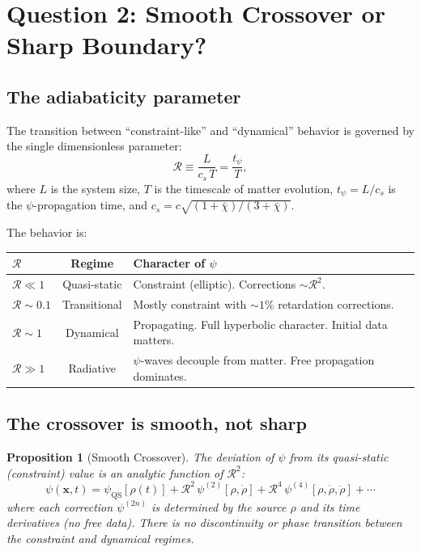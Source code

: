 \documentclass[12pt,a4paper]{article}
\newtheorem{proposition}[theorem]{Proposition}
\begin{document}
\section{Question 2: Smooth Crossover or Sharp Boundary?}
\label{sec:Q2}

\subsection{The adiabaticity parameter}

The transition between ``constraint-like'' and ``dynamical'' behavior
is governed by the single dimensionless parameter:
\begin{equation}\label{eq:R-def}
\mathcal{R} \equiv \frac{L}{c_s\,T} = \frac{t_\psi}{T},
\end{equation}
where $L$ is the system size, $T$ is the timescale of matter evolution,
$t_\psi = L/c_s$ is the $\psi$-propagation time, and
$c_s = c\sqrt{(1+\bar\chi)/(3+\bar\chi)}$.

The behavior is:
\begin{center}
\renewcommand{\arraystretch}{1.4}
\begin{tabular}{lcl}
\toprule
$\mathcal{R}$ & Regime & Character of $\psi$ \\
\midrule
$\mathcal{R} \ll 1$ & Quasi-static & Constraint (elliptic). Corrections
$\sim \mathcal{R}^2$. \\
$\mathcal{R} \sim 0.1$ & Transitional & Mostly constraint with $\sim 1\%$
retardation corrections. \\
$\mathcal{R} \sim 1$ & Dynamical & Propagating. Full hyperbolic character.
Initial data matters. \\
$\mathcal{R} \gg 1$ & Radiative & $\psi$-waves decouple from matter.
Free propagation dominates. \\
\bottomrule
\end{tabular}
\end{center}

\subsection{The crossover is smooth, not sharp}

\begin{proposition}[Smooth Crossover]
\label{prop:smooth}
The deviation of $\psi$ from its quasi-static (constraint) value is an
analytic function of $\mathcal{R}^2$:
\begin{equation}\label{eq:expansion}
\psi(\mathbf{x},t) = \psi_\mathrm{QS}[\rho(t)]
+ \mathcal{R}^2\,\psi^{(2)}[\rho, \dot\rho]
+ \mathcal{R}^4\,\psi^{(4)}[\rho, \dot\rho, \ddot\rho]
+ \cdots
\end{equation}
where each correction $\psi^{(2n)}$ is determined by the source $\rho$
and its time derivatives (no free data). There is no discontinuity or
phase transition between the constraint and dynamical regimes.
\end{proposition}
\end{document}
